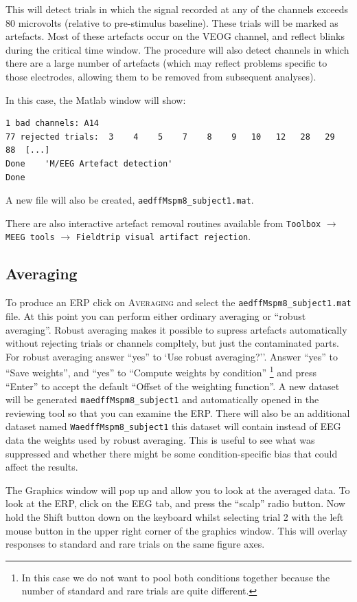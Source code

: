 This will detect trials in which the signal recorded at any of the channels exceeds 80 microvolts (relative to pre-stimulus baseline). These trials will be marked as artefacts. Most of these artefacts occur on the VEOG channel, and reflect blinks during the critical time window. The procedure will also detect channels in which there are a large number of artefacts (which may reflect problems specific to those electrodes, allowing them to be removed from subsequent analyses).

In this case, the Matlab window will show:
\begin{verbatim}
1 bad channels: A14 
77 rejected trials:  3    4    5    7    8    9   10   12   28   29   88  [...]
Done    'M/EEG Artefact detection'
Done
\end{verbatim}
A new file will also be created, \texttt{aedffMspm8\_subject1.mat}.

There are also interactive artefact removal routines available from \texttt{Toolbox} $\rightarrow$ \texttt{MEEG tools} $\rightarrow$  \texttt{Fieldtrip visual artifact rejection}.

\subsection{Averaging}
To produce an ERP click on \textsc{Averaging} and select the \texttt{aedffMspm8\_subject1.mat} file. At this point you can perform either ordinary averaging or ``robust averaging''. Robust averaging makes it possible to supress artefacts automatically without rejecting trials or channels compltely, but just the contaminated parts. For robust averaging answer ``yes'' to `Use robust averaging?''. Answer ``yes'' to ``Save weights'', and ``yes'' to ``Compute weights by condition'' \footnote{In this case we do not want to pool both conditions together because the number of standard and rare trials are quite different.} and press ``Enter'' to accept the default ``Offset of the weighting function''. A new dataset will be generated \texttt{maedffMspm8\_subject1}  and automatically opened in the reviewing tool so that you can examine the ERP. There will also be an additional dataset named \texttt{WaedffMspm8\_subject1} this dataset will contain instead of EEG data the weights used by robust averaging. This is useful to see what was suppressed and whether there might be some condition-specific bias that could affect the results.

The Graphics window will pop up and allow you to look at the averaged data. To look at the ERP, click on the EEG tab, and press the ``scalp'' radio button. Now hold  the Shift button down on the keyboard whilst selecting trial 2 with the left mouse button in the upper right corner of the graphics window. This will overlay responses to standard and rare trials on the same figure axes.

